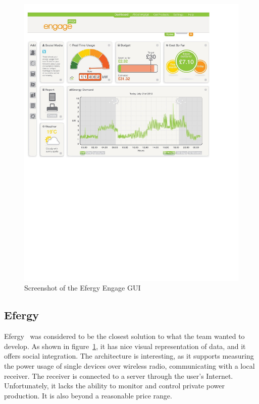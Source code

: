 \begin{figure}[H]
\centering
\includegraphics[width=13cm, trim=0.5cm 12cm 3cm 0.7cm, clip]{ch/prestudy/fig/efergy.pdf}
\caption{Screenshot of the Efergy Engage GUI}
\label{fig:efergyGUI}
\end{figure}

\subsection{Efergy}

Efergy~\cite{efergy} was considered to be the closest solution to what the team wanted to develop. As shown in figure~\ref{fig:efergyGUI}, it has nice visual representation of data, and it offers social integration. The architecture is interesting, as it supports measuring the power usage of single devices over wireless radio, communicating with a local receiver. The receiver is connected to a server through the user's Internet. Unfortunately, it lacks the ability to monitor and control private power production. It is also beyond a reasonable price range.




